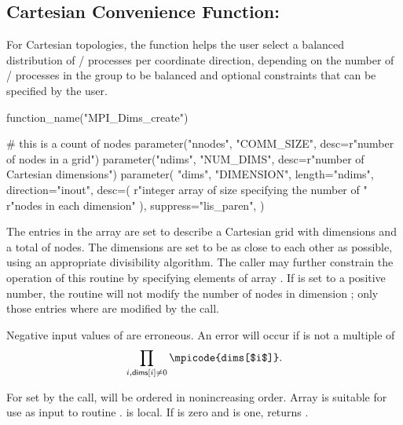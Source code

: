 \subsection{Cartesian Convenience Function: \texorpdfstring{}{MPI\_DIMS\_CREATE}}

For Cartesian topologies, the function  helps the user
select a balanced distribution of \MPI/ processes per coordinate direction,
depending on the number of \MPI/ processes in the group to be balanced and optional
constraints that can be specified by the user.

\begin{mpi-binding}
    function_name("MPI_Dims_create")
    
    # this is a count of nodes
    parameter("nnodes", "COMM_SIZE", desc=r"number of nodes in a grid")
    parameter("ndims", "NUM_DIMS", desc=r"number of Cartesian dimensions")
    parameter(
        "dims",
        "DIMENSION",
        length="ndims",
        direction="inout",
        desc=(
            r"integer array of size  specifying the number of "
            r"nodes in each dimension"
        ),
        suppress="lis_paren",
    )
\end{mpi-binding}

The entries in the array  are set to describe a Cartesian grid
with  dimensions and a total of  nodes.  The
dimensions are set to be as close to each other as possible, using an
appropriate divisibility algorithm.  The caller may
further constrain the operation of this routine by specifying elements
of array . If  is set to a positive number, the
routine will not modify the number of nodes in dimension ;
only those entries where  are modified by the call.

Negative input values of  are erroneous.
An error will occur if  is not a multiple of
$$\prod_{i, \textsf{\scriptsize{}dims}[i]\neq 0} \mpicode{dims[$i$]}.$$ %

For  set by the call,  will be ordered in
nonincreasing order.  Array  is suitable for use as input to
routine .   is local.
If  is zero and  is one,  returns .

